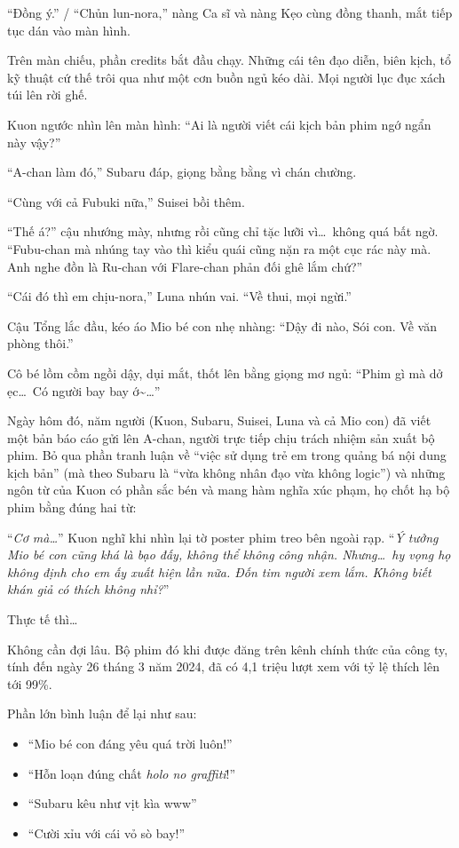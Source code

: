 \documentclass[../main.tex]{subfiles}
\begin{document}
``Đồng ý.'' / ``Chủn lun-nora,'' nàng Ca sĩ và nàng Kẹo cùng đồng thanh, mắt tiếp tục dán vào màn hình.

Trên màn chiếu, phần credits bắt đầu chạy. Những cái tên đạo diễn, biên kịch, tổ kỹ thuật cứ thế trôi qua như một cơn buồn ngủ kéo dài. Mọi người lục đục xách túi lên rời ghế.

Kuon ngước nhìn lên màn hình: ``Ai là người viết cái kịch bản phim ngớ ngẩn này vậy?''

``A-chan làm đó,'' Subaru đáp, giọng bằng bằng vì chán chường.

``Cùng với cả Fubuki nữa,'' Suisei bồi thêm.

``Thế á?'' cậu nhướng mày, nhưng rồi cũng chỉ tặc lưỡi vì\dots\ không quá bất ngờ. ``Fubu-chan mà nhúng tay vào thì kiểu quái cũng nặn ra một cục rác này mà. Anh nghe đồn là Ru-chan với Flare-chan phản đối ghê lắm chứ?''

``Cái đó thì em chịu-nora,'' Luna nhún vai. ``Về thui, mọi ngừi.''

Cậu Tổng lắc đầu, kéo áo Mio bé con nhẹ nhàng: ``Dậy đi nào, Sói con. Về văn phòng thôi.''

Cô bé lồm cồm ngồi dậy, dụi mắt, thốt lên bằng giọng mơ ngủ: ``Phim gì mà dở ẹc\dots\ Có người bay bay ớ\~{}\dots''

\ct

Ngày hôm đó, năm người (Kuon, Subaru, Suisei, Luna và cả Mio con) đã viết một bản báo cáo gửi lên A-chan, người trực tiếp chịu trách nhiệm sản xuất bộ phim. Bỏ qua phần tranh luận về ``việc sử dụng trẻ em trong quảng bá nội dung kịch bản'' (mà theo Subaru là ``vừa không nhân đạo vừa không logic'') và những ngôn từ của Kuon có phần sắc bén và mang hàm nghĩa xúc phạm, họ chốt hạ bộ phim bằng đúng hai từ:


``\textit{Cơ mà\dots}'' Kuon nghĩ khi nhìn lại tờ poster phim treo bên ngoài rạp. ``\textit{Ý tưởng Mio bé con cũng khá là bạo đấy, không thể không công nhận. Nhưng\dots\ hy vọng họ không định cho em ấy xuất hiện lần nữa. Đốn tim người xem lắm. Không biết khán giả có thích không nhỉ?}''

Thực tế thì\dots

Không cần đợi lâu. Bộ phim đó khi được đăng trên kênh chính thức của công ty, tính đến ngày 26 tháng 3 năm 2024, đã có 4,1 triệu lượt xem với tỷ lệ thích lên tới 99\%.

Phần lớn bình luận để lại như sau:
\begin{itemize}
  \item ``Mio bé con đáng yêu quá trời luôn!''
  \item ``Hỗn loạn đúng chất \textit{holo no graffiti}!''
  \item ``Subaru kêu như vịt kìa www''
  \item ``Cười xỉu với cái vỏ sò bay!''
\end{itemize}
\end{document}
